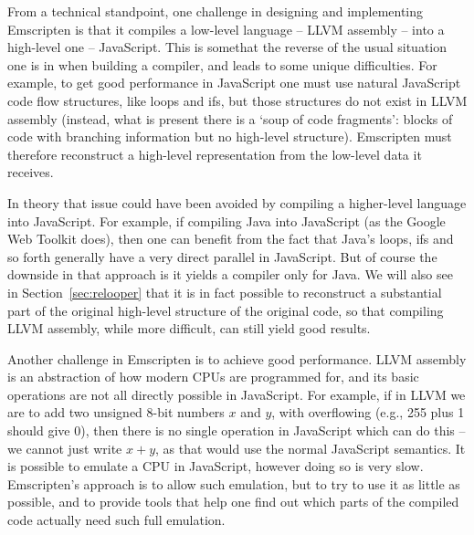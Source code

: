 \documentclass[preprint,10pt]{sigplanconf}
\begin{document}
From a technical standpoint, one challenge in designing and implementing
Emscripten is that it compiles a low-level language -- LLVM assembly -- into
a high-level one -- JavaScript. This is somethat the reverse of the usual
situation one is in when building a compiler, and leads to some unique
difficulties. For example, to get good performance in JavaScript one must
use natural JavaScript code flow structures, like loops and ifs, but
those structures do not exist in LLVM assembly (instead, what is present
there is a `soup of code fragments': blocks of code with branching information
but no high-level structure).
Emscripten must therefore reconstruct a high-level
representation from the low-level data it receives.

In theory that issue could have been avoided by compiling a higher-level
language into JavaScript. For example, if compiling Java into JavaScript
(as the Google Web Toolkit does), then one can benefit from the fact
that Java's loops, ifs and so forth generally have a very direct parallel
in JavaScript. But of course the downside in that approach is it yields a
compiler only for Java. We will also see in Section~\ref{sec:relooper} that it is in fact possible to reconstruct
a substantial part of the original high-level structure of the original code,
so that compiling LLVM assembly, while more difficult, can still yield good results.

Another challenge in Emscripten is to achieve good performance. LLVM assembly
is an abstraction of how modern CPUs are programmed for, and its basic
operations are not all directly possible in JavaScript. For example, if in
LLVM we are to add two unsigned 8-bit numbers $x$ and $y$, with overflowing (e.g., 255
plus 1 should give 0), then there is no single operation in JavaScript which
can do this -- we cannot just write $x+y$, as that would use the normal JavaScript
semantics. It is possible to emulate a CPU in JavaScript, however doing so
is very slow. Emscripten's approach is to allow such emulation, but to try to
use it as little as possible, and to provide tools that help one find out
which parts of the compiled code actually need such full emulation.
\end{document}

